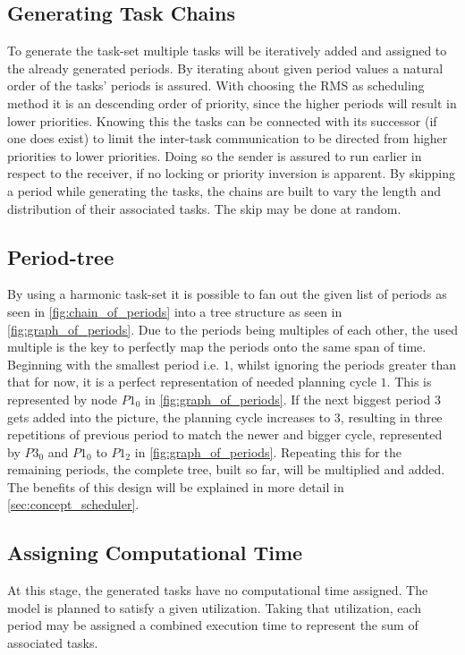 \subsection{Generating Task Chains}\label{sec:concept_task_chains}
To generate the task-set multiple tasks will be iteratively added and assigned to the already generated periods.
By iterating about given period values a natural order of the tasks' periods is assured.
With choosing the \ac{RMS} as scheduling method it is an descending order of priority, since the higher periods will result in lower priorities.
Knowing this the tasks can be connected with its successor (if one does exist) to limit the inter-task communication to be directed from higher priorities to lower priorities.
Doing so the sender is assured to run earlier in respect to the receiver, if no locking or priority inversion is apparent. 
By skipping a period while generating the tasks, the chains are built to vary the length and distribution of their associated tasks.
The skip may be done at random. 

\subsection{Period-tree}\label{sec:period_tree}
By using a harmonic task-set it is possible to fan out the given list of periods as seen in \cref{fig:chain_of_periods} into a tree structure as seen in \cref{fig:graph_of_periods}.
Due to the periods being multiples of each other, the used multiple is the key to perfectly map the periods onto the same span of time.
Beginning with the smallest period i.e. $1$, whilst ignoring the periods greater than that for now, it is a perfect representation of needed planning cycle $1$.
This is represented by node $P1_0$ in \cref{fig:graph_of_periods}.
If the next biggest period $3$ gets added into the picture, the planning cycle increases to $3$, resulting in three repetitions of previous period to match the newer and bigger cycle, represented by $P3_0$ and $P1_0$ to $P1_2$ in \cref{fig:graph_of_periods}.
Repeating this for the remaining periods, the complete tree, built so far, will be multiplied and added.
The benefits of this design will be explained in more detail in \cref{sec:concept_scheduler}.

\subsection{Assigning Computational Time}\label{sec:concept_load_spread}
At this stage, the generated tasks have no computational time assigned.
The model is planned to satisfy a given utilization.
Taking that utilization, each period may be assigned a combined execution time to represent the sum of associated tasks.

